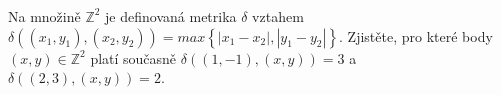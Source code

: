 \subsubsection{}
Na množině $\mathbb{Z}^{2}$ je definovaná metrika $\delta$ vztahem $\delta
((x_{1},y_{1}), (x_{2},y_{2})) = max \left \{ \left | x_{1}-x_{2} \right |,\left
| y_{1}-y_{2} \right | \right \}$. Zjistěte, pro které body $(x,y) \in
\mathbb{Z}^{2}$ platí současně $\delta ((1,-1), (x,y))= 3$ a
$\delta((2,3),(x,y))=2$.
